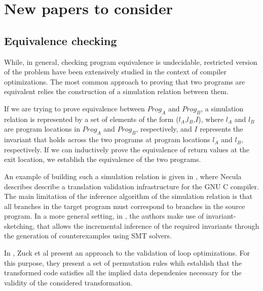 \documentclass[runningheads,a4paper]{llncs}
\begin{document}






\section{New papers to consider}

\subsection{Equivalence checking}

While, in general, checking program equivalence is undecidable,
restricted version of the problem have been extensively studied in the
context of compiler optimizations.  The most common approach to
proving that two programs are equivalent relies the construction of a
simulation relation between them.

If we are trying to prove equivalence between $Prog_A$ and $Prog_B$, a
simulation relation is represented by a set of elements of the form
($l_A$,$l_B$,$I$), where $l_{A}$ and $l_{B}$ are program locations in
$Prog_A$ and $Prog_B$, respectively, and $I$ represents the invariant
that holds across the two programs at program locations $l_{A}$ and
$l_{B}$, respectively.  If we can inductively prove the equivalence of
return values at the exit location, we establish the equivalence of
the two programs.


An example of building such a simulation relation is given in \cite{DBLP:conf/pldi/Necula00},
where Necula describes describe a
translation validation infrastructure for the GNU C compiler. %
The main limitation of the inference algorithm of the simulation
relation is that all branches in the target program must correspond to
branches in the source program.  In a more general setting, in
\cite{DBLP:conf/sat/GuptaSMB18}, the authors make use of
invariant-sketching, that allows the incremental inference of the
required invariants through the generation of counterexamples using
SMT solvers.

In \cite{DBLP:journals/fmsd/ZuckPGBFH05}, Zuck et al present an
approach to the validation of loop optimizations.  For this purpose,
they present a set of permutation rules whih establish that the
transformed code satisfies all the implied data dependenies necessary
for the validity of the considered transformation.
\end{document}
